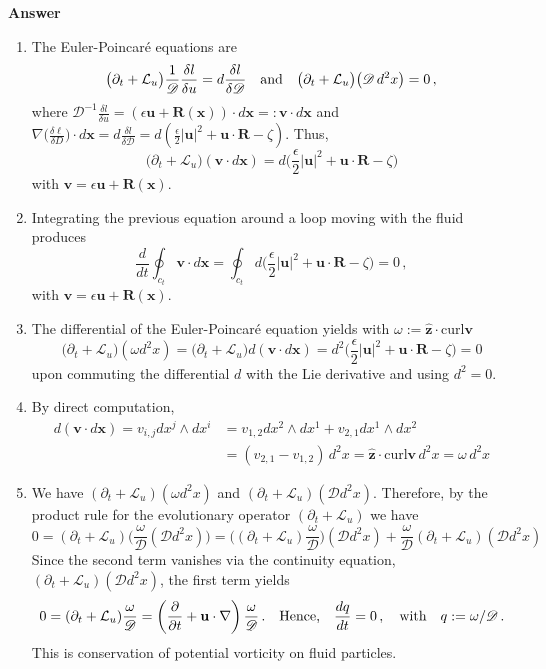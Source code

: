 \documentclass[11pt, oneside]{article}   	%
\numberwithin{equation}{section}
\theoremstyle{plain}
\theoremstyle{definition}
\theoremstyle{remark}
\newcommand{\<}{\langle}
\renewcommand{\>}{\rangle}
\begin{document}
\textbf{Answer}
\begin{enumerate}
\item
The Euler-Poincar\'e equations are 
\[
\big(\partial_t +  \mathcal{L}_u\big)\frac{1}{\mathscr{D}}\frac{\delta l}{\delta u} = d\frac{\delta l}{\delta \mathscr{D}}
\quad\hbox{and}\quad
\big(\partial_t +  \mathcal{L}_u\big) \big(\mathscr{D}\,d^2x\big) = 0\,,
\]
where $\mathscr{D}^{-1}\frac{\delta l}{\delta u}=(\epsilon \mathbf{u} + \mathbf{R}(\mathbf{x}))\cdot d \mathbf{x}=: \mathbf{v} \cdot d \mathbf{x}$ and 
$\nabla\Big(\frac{\delta \ell}{\delta D}\Big)\cdot d\mathbf{x}=d\frac{\delta l}{\delta \mathscr{D}}=d(\frac{\epsilon}{2} |\mathbf{u}|^2+\mathbf{u}\cdot\mathbf{R} - \zeta)$. Thus,
\[
\big(\partial_t +  \mathcal{L}_u\big) (\mathbf{v} \cdot d \mathbf{x})
= d\Big(\frac{\epsilon}{2} |\mathbf{u}|^2+\mathbf{u}\cdot\mathbf{R} - \zeta\Big)
\]
 with $\mathbf{v}=\epsilon \mathbf{u} + \mathbf{R}(\mathbf{x})$. 
\item
Integrating the previous equation around a loop moving with the fluid produces 
\[
\frac{d}{dt} \oint_{c_t} \mathbf{v} \cdot d \mathbf{x} =  \oint_{c_t} d\Big(\frac{\epsilon}{2} |\mathbf{u}|^2+\mathbf{u}\cdot\mathbf{R} - \zeta\Big) = 0 \,,
\]
 with $\mathbf{v}=\epsilon \mathbf{u} + \mathbf{R}(\mathbf{x})$. 
 \item
 The differential of the Euler-Poincar\'e equation yields with $\omega := \mathbf{\hat{z}}\cdot\mathrm{curl}\mathbf{v}$
\[
\big(\partial_t +  \mathcal{L}_u\big) (\omega d^2x)
= \big(\partial_t +  \mathcal{L}_u\big) d(\mathbf{v} \cdot d \mathbf{x})
= d^2\Big(\frac{\epsilon}{2} |\mathbf{u}|^2+\mathbf{u}\cdot\mathbf{R} - \zeta\Big) = 0
\]
upon commuting the differential $d$ with the Lie derivative and using $d^2=0$. 
\item
By direct computation,
\begin{align*}
d (\mathbf{v} \cdot d \mathbf{x}) = v_{i,j}dx^j\wedge dx^i 
&= v_{1,2}dx^2\wedge dx^1 + v_{2,1}dx^1\wedge dx^2
\\&= (v_{2,1} - v_{1,2})\,d^2x
= \mathbf{\hat{z}}\cdot\mathrm{curl}\mathbf{v}\,d^2x = \omega \,d^2x
\end{align*}
\item
We have $(\partial_t +  \mathcal{L}_u) (\omega d^2x)$ and $(\partial_t +  \mathcal{L}_u) (\mathscr{D} d^2x)$. Therefore, by the product rule for the evolutionary operator $(\partial_t +  \mathcal{L}_u)$ we have
\[
0 = (\partial_t +  \mathcal{L}_u)\Big( \frac{\omega}{\mathscr{D}} (\mathscr{D} d^2x) \Big) 
= \Big( (\partial_t +  \mathcal{L}_u) \frac{\omega}{\mathscr{D}}\Big) (\mathscr{D} d^2x)
+ \frac{\omega}{\mathscr{D}} (\partial_t +  \mathcal{L}_u) (\mathscr{D} d^2x)
\]
Since the second term vanishes via the continuity equation, $(\partial_t +  \mathcal{L}_u) (\mathscr{D} d^2x)$, the first term yields
\[
0 = (\partial_t +  \mathcal{L}_u) \frac{\omega}{\mathscr{D}} = \left(\frac{\partial}{\partial t} + \mathbf{u}\cdot\nabla\right)\frac{\omega}{\mathscr{D}}
\,.\quad \hbox{Hence,}\quad 
\frac{dq}{dt} = 0
\,,\quad \hbox{with}\quad q:= \omega/\mathscr{D}\,.
\]
This is conservation of potential vorticity on fluid particles.


\end{enumerate}
\end{document}
